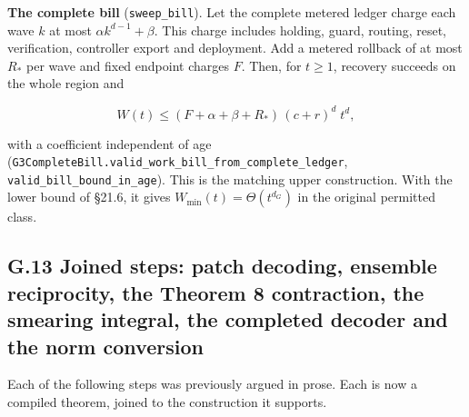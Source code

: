 \documentclass[
]{article}
\begin{document}
\textbf{The complete bill} (\texttt{sweep\_bill}). Let the complete
metered ledger charge each wave \(k\) at most \(\alpha k^{d-1}+\beta\).
This charge includes holding, guard, routing, reset, verification,
controller export and deployment. Add a metered rollback of at most
\(R_*\) per wave and fixed endpoint charges \(F\). Then, for \(t\ge1\),
recovery succeeds on the whole region and

\[
W(t)\le (F+\alpha+\beta+R_*)\,(c+r)^{d}\;t^{d},
\]

with a coefficient independent of age
(\texttt{G\allowbreak{}3\allowbreak{}C\allowbreak{}o\allowbreak{}m\allowbreak{}p\allowbreak{}l\allowbreak{}e\allowbreak{}t\allowbreak{}e\allowbreak{}B\allowbreak{}i\allowbreak{}l\allowbreak{}l\allowbreak{}.\allowbreak{}v\allowbreak{}a\allowbreak{}l\allowbreak{}i\allowbreak{}d\allowbreak{}\_\allowbreak{}w\allowbreak{}o\allowbreak{}r\allowbreak{}k\allowbreak{}\_\allowbreak{}b\allowbreak{}i\allowbreak{}l\allowbreak{}l\allowbreak{}\_\allowbreak{}f\allowbreak{}r\allowbreak{}o\allowbreak{}m\allowbreak{}\_\allowbreak{}c\allowbreak{}o\allowbreak{}m\allowbreak{}p\allowbreak{}l\allowbreak{}e\allowbreak{}t\allowbreak{}e\allowbreak{}\_\allowbreak{}l\allowbreak{}e\allowbreak{}d\allowbreak{}g\allowbreak{}e\allowbreak{}r},
\texttt{v\allowbreak{}a\allowbreak{}l\allowbreak{}i\allowbreak{}d\allowbreak{}\_\allowbreak{}b\allowbreak{}i\allowbreak{}l\allowbreak{}l\allowbreak{}\_\allowbreak{}b\allowbreak{}o\allowbreak{}u\allowbreak{}n\allowbreak{}d\allowbreak{}\_\allowbreak{}i\allowbreak{}n\allowbreak{}\_\allowbreak{}a\allowbreak{}g\allowbreak{}e}).
This is the matching upper construction. With the lower bound of §21.6,
it gives \(W_{\min}(t)=\Theta(t^{d_G})\) in the original permitted
class.

\subsection{G.13 Joined steps: patch decoding, ensemble reciprocity, the
Theorem 8 contraction, the smearing integral, the completed decoder and
the norm
conversion}\label{g.13-joined-steps-patch-decoding-ensemble-reciprocity-the-theorem-8-contraction-the-smearing-integral-the-completed-decoder-and-the-norm-conversion}

Each of the following steps was previously argued in prose. Each is now
a compiled theorem, joined to the construction it supports.
\end{document}
